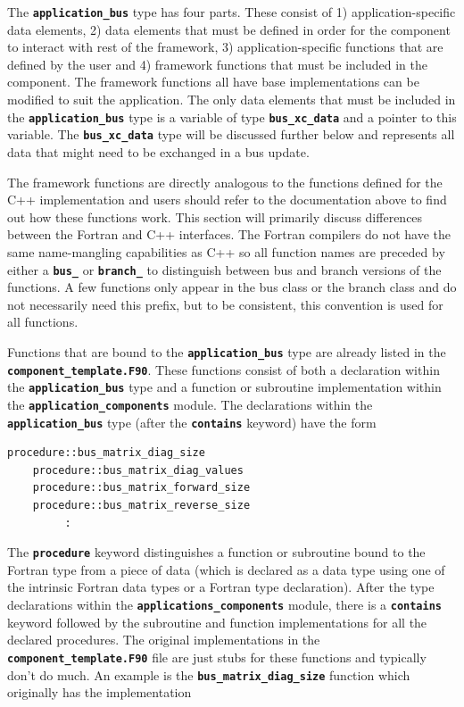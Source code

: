 \documentclass[12pt]{report} %
\begin{document}
The \texttt{\textbf{application\_bus}} type has four parts. These consist of 1) application-specific data elements, 2) data elements that must be defined in order for the component to interact with rest of the framework, 3) application-specific functions that are defined by the user and 4) framework functions that must be included in the component. The framework functions all have base implementations can be modified to suit the application. The only data elements that must be included in the \texttt{\textbf{application\_bus}} type is a variable of type \texttt{\textbf{bus\_xc\_data}} and a pointer to this variable. The \texttt{\textbf{bus\_xc\_data}} type will be discussed further below and represents all data that might need to be exchanged in a bus update.

The framework functions are directly analogous to the functions defined for the C++ implementation and users should refer to the documentation above to find out how these functions work. This section will primarily discuss differences between the Fortran and C++ interfaces. The Fortran compilers do not have the same name-mangling capabilities as C++ so all function names are preceded by either a \texttt{\textbf{bus\_}} or \texttt{\textbf{branch\_}} to distinguish between bus and branch versions of the functions. A few functions only appear in the bus class or the branch class and do not necessarily need this prefix, but to be consistent, this convention is used for all functions.

Functions that are bound to the \texttt{\textbf{application\_bus}} type are already listed in the \texttt{\textbf{component\_template.F90}}. These functions consist of both a declaration within the \texttt{\textbf{application\_bus}} type and a function or subroutine implementation within the \texttt{\textbf{application\_components}} module. The declarations within the \texttt{\textbf{application\_bus}} type (after the \texttt{\textbf{contains}} keyword) have the form

{
\color{red}
\begin{Verbatim}[fontseries=b]
    procedure::bus_matrix_diag_size
    procedure::bus_matrix_diag_values
    procedure::bus_matrix_forward_size
    procedure::bus_matrix_reverse_size
         :
\end{Verbatim}
}

The \texttt{\textbf{procedure}} keyword distinguishes a function or subroutine bound to the Fortran type from a piece of data (which is declared as a data type using one of the intrinsic Fortran data types or a Fortran type declaration).
After the type declarations within the \texttt{\textbf{applications\_components}} module, there is a \texttt{\textbf{contains}} keyword followed by the subroutine and function implementations for all the declared procedures. The original implementations in the \texttt{\textbf{component\_template.F90}} file are just stubs for these functions and typically don't do much. An example is the \texttt{\textbf{bus\_matrix\_diag\_size}} function which originally has the implementation
\end{document}
